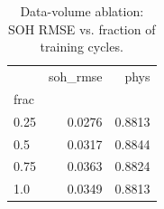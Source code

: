 \begin{table}
\caption{Data-volume ablation: SOH RMSE vs. fraction of training cycles.}
\label{tab:ablation_data_volume}
\begin{tabular}{lrr}
\toprule
 & soh\_rmse & phys \\
frac &  &  \\
\midrule
0.25 & 0.0276 & 0.8813 \\
0.5 & 0.0317 & 0.8844 \\
0.75 & 0.0363 & 0.8824 \\
1.0 & 0.0349 & 0.8813 \\
\bottomrule
\end{tabular}
\end{table}
